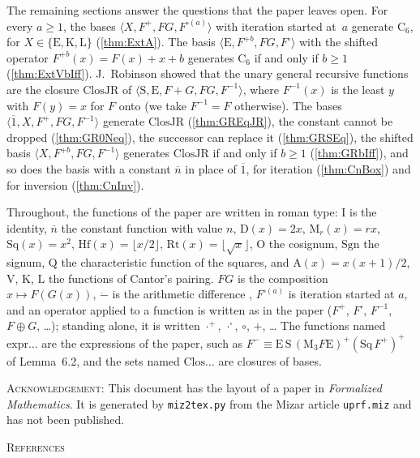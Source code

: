\documentclass[10pt]{article}
\newcommand{\fmkeep}{\par\vskip 0pt plus 8\baselineskip\penalty-200
  \vskip 0pt plus -8\baselineskip}
\newcommand{\fmunnumbered}[1]{%
  \fmkeep\bigskip\begin{center}\normalsize\scshape #1\end{center}\nopagebreak\smallskip}
\newcommand{\thref}[1]{(\ref{thm:#1})}
\begin{document}
The remaining sections answer the questions that the paper leaves open. For
every $a \geq 1$, the bases $\langle X, F^{+}, FG, F^{\square(a)}\rangle$ with
iteration started at~$a$ generate $\mathrm{C}_6$, for
$X \in \{\mathrm{E}, \mathrm{K}, \mathrm{L}\}$ \thref{ExtA}. The basis
$\langle \mathrm{E}, F^{+b}, FG, F^{\square}\rangle$ with the shifted operator
$F^{+b}(x) = F(x) + x + b$ generates $\mathrm{C}_6$ if and only if $b \geq 1$
\thref{ExtVbIff}. J.~Robinson \cite{jrobinson1950} showed that the unary
general recursive functions are the closure $\mathrm{ClosJR}$ of
$\langle \mathrm{S}, \mathrm{E}, F + G, FG, F^{-1}\rangle$, where
$F^{-1}(x)$ is the least $y$ with $F(y) = x$ for $F$ onto (we take
$F^{-1} = F$ otherwise). The bases
$\langle \overline{1}, X, F^{+}, FG, F^{-1}\rangle$ generate $\mathrm{ClosJR}$
\thref{GREqJR}, the constant cannot be dropped \thref{GR0Neq}, the successor
can replace it \thref{GRSEq}, the shifted basis
$\langle X, F^{+b}, FG, F^{-1}\rangle$ generates $\mathrm{ClosJR}$ if and only
if $b \geq 1$ \thref{GRbIff}, and so does the basis with a constant
$\overline{n}$ in place of $\overline{1}$, for iteration \thref{CnBox} and for
inversion \thref{CnInv}.

Throughout, the functions of the paper are written in roman type:
$\mathrm{I}$ is the identity, $\overline{n}$ the constant function with value
$n$, $\mathrm{D}(x) = 2x$, $\mathrm{M}_r(x) = rx$, $\mathrm{Sq}(x) = x^2$,
$\mathrm{Hf}(x) = \lfloor x/2\rfloor$, $\mathrm{Rt}(x) = \lfloor\sqrt{x}\rfloor$,
$\mathrm{O}$ the cosignum, $\mathrm{Sgn}$ the signum, $\mathrm{Q}$ the
characteristic function of the squares, and $\mathrm{A}(x) = x(x+1)/2$,
$\mathrm{V}$, $\mathrm{K}$, $\mathrm{L}$ the functions of Cantor's pairing.
$FG$ is the composition $x \mapsto F(G(x))$, $\dot{-}$ is the arithmetic
difference \cite{natd}, $F^{\square(a)}$ is iteration started at $a$, and an
operator applied to a function is written as in the paper ($F^{+}$,
$F^{\square}$, $F^{-1}$, $F \oplus G$, \ldots); standing alone, it is written
${\cdot}^{+}$, ${\cdot}^{\square}$, $\circ$, $+$, \ldots{} The
functions named $\mathrm{expr}\ldots$ are the expressions of the paper, such as
$F^{-} \equiv \mathrm{E}\,\mathrm{S}\,(\mathrm{M}_3 F \mathrm{E})^{+}
(\mathrm{Sq}\,F^{+})^{+}$ of Lemma~6.2, and the sets named
$\mathrm{Clos}\ldots$ are closures of bases.



\bigskip
\noindent\textsc{Acknowledgement:} This document has the layout of a paper in
\emph{Formalized Mathematics}. It is generated by \texttt{miz2tex.py} from the
Mizar article \texttt{uprf.miz} and has not been published.

\makeatletter
{\footnotesize
\fmunnumbered{References}
\let\section\@gobbletwo
\setlength{\itemsep}{0pt}

}
\makeatother
\end{document}
